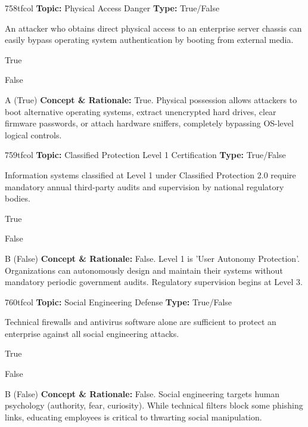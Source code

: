 \begin{qcard}{758}{tfcol}
\textcolor{darkslate!75}{\small\textbf{Topic:} Physical Access Danger \hfill \textbf{Type:} True/False}\vspace{0.4em}\par
An attacker who obtains direct physical access to an enterprise server chassis can easily bypass operating system authentication by booting from external media.
\begin{qoptions}
\item True
\item False
\end{qoptions}
\end{qcard}
\nopagebreak
\begin{explainbox}{A (True)}
\textbf{Concept \& Rationale:} True. Physical possession allows attackers to boot alternative operating systems, extract unencrypted hard drives, clear firmware passwords, or attach hardware sniffers, completely bypassing OS-level logical controls.
\end{explainbox}

\begin{qcard}{759}{tfcol}
\textcolor{darkslate!75}{\small\textbf{Topic:} Classified Protection Level 1 Certification \hfill \textbf{Type:} True/False}\vspace{0.4em}\par
Information systems classified at Level 1 under Classified Protection 2.0 require mandatory annual third-party audits and supervision by national regulatory bodies.
\begin{qoptions}
\item True
\item False
\end{qoptions}
\end{qcard}
\nopagebreak
\begin{explainbox}{B (False)}
\textbf{Concept \& Rationale:} False. Level 1 is 'User Autonomy Protection'. Organizations can autonomously design and maintain their systems without mandatory periodic government audits. Regulatory supervision begins at Level 3.
\end{explainbox}

\begin{qcard}{760}{tfcol}
\textcolor{darkslate!75}{\small\textbf{Topic:} Social Engineering Defense \hfill \textbf{Type:} True/False}\vspace{0.4em}\par
Technical firewalls and antivirus software alone are sufficient to protect an enterprise against all social engineering attacks.
\begin{qoptions}
\item True
\item False
\end{qoptions}
\end{qcard}
\nopagebreak
\begin{explainbox}{B (False)}
\textbf{Concept \& Rationale:} False. Social engineering targets human psychology (authority, fear, curiosity). While technical filters block some phishing links, educating employees is critical to thwarting social manipulation.
\end{explainbox}

